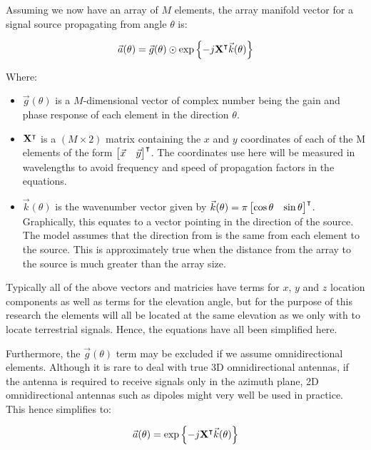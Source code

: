 Assuming we now have an array of \(M\) elements, the array manifold vector for a signal source propagating from angle \(\theta\) is: \cite{dacos1995estimating}

\begin{equation}
\vec{a}(\theta) = \vec{g}(\theta) \odot \exp \left\{ -j \mathbf{X}^\intercal \vec{k}(\theta) \right\}
\end{equation}

Where:
\begin{itemize}
  \item \(\vec{g}(\theta)\) is a \(M\)-dimensional vector of complex number being the gain and phase response  of each element in the direction \(\theta\). 
\item \(\mathbf{X}^\intercal\) is a \((M \times 2)\) matrix containing the \(x\) and \(y\) coordinates of each of the M elements of the form \(\begin{bmatrix} \vec{x} & \vec{y} \end{bmatrix}^\intercal\). The coordinates use here will be measured in wavelengths to avoid frequency and speed of propagation factors in the equations.
\item \(\vec{k}(\theta)\) is the wavenumber vector given by \(\vec{k}(\theta) = \pi \begin{bmatrix} \cos\theta & \sin\theta \end{bmatrix}^\intercal \). Graphically, this equates to a vector pointing in the direction of the source. The model assumes that the direction from is the same from each element to the source. This is approximately true when the distance from the array to the source is much greater than the array size.
\end{itemize}

Typically all of the above vectors and matricies have terms for \(x\), \(y\) and \(z\) location components as well as terms for the elevation angle, but for the purpose of this research the elements will all be located at the same elevation as we only with to locate terrestrial signals. Hence, the equations have all been simplified here.

Furthermore, the \(\vec{g}(\theta)\) term may be excluded if we assume omnidirectional elements. Although it is rare to deal with true 3D omnidirectional antennas, if the antenna is required to receive signals only in the azimuth plane, 2D omnidirectional antennas such as dipoles might very well be used in practice. This hence simplifies to:

\begin{equation}
  \vec{a}(\theta) = \exp \left\{ -j \mathbf{X}^\intercal \vec{k}(\theta) \right\}
\end{equation}


